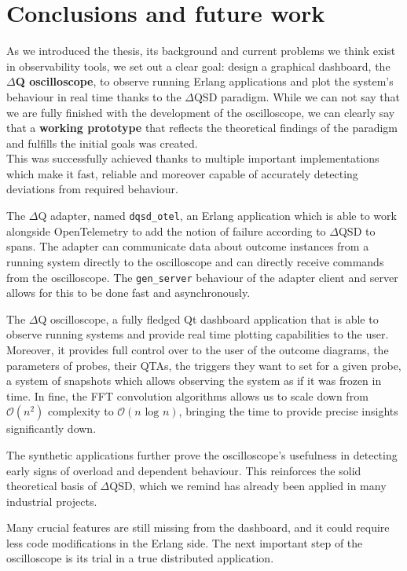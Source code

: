 \chapter{Conclusions and future work}

    As we introduced the thesis, its background and current problems we think exist in observability tools, we set out a clear goal: design a graphical dashboard, the \textbf{$\Delta$Q oscilloscope}, to observe running Erlang applications and plot the system's behaviour in real time thanks to the $\Delta$QSD paradigm.
    While we can not say that we are fully finished with the development of the oscilloscope, we can clearly say that a \textbf{working prototype} that reflects the theoretical findings of the paradigm and fulfills the initial goals was created. \\
    This was successfully achieved thanks to multiple important implementations which make it fast, reliable and moreover capable of accurately detecting deviations from required behaviour.
    
    The $\Delta$Q adapter, named \texttt{dqsd\_otel}, an Erlang application which is able to work alongside OpenTelemetry to add the notion of failure according to $\Delta$QSD to spans. The adapter can communicate data about outcome instances from a running system directly to the oscilloscope and can directly receive commands from the oscilloscope. The \texttt{gen\_server} behaviour of the adapter client and server allows for this to be done fast and asynchronously.


    The $\Delta$Q oscilloscope, a fully fledged Qt dashboard application that is able to observe running systems and provide real time plotting capabilities to the user. Moreover, it provides full control over to the user of the outcome diagrams, the parameters of probes, their QTAs, the triggers they want to set for a given probe, a system of snapshots which allows observing the system as if it was frozen in time. In fine, the FFT convolution algorithms allows us to scale down from $\mathcal{O}(n^2)$ complexity to $\mathcal{O}(n\text{ log }n)$, bringing the time to provide precise insights significantly down.

    The synthetic applications further prove the oscilloscope's usefulness in detecting early signs of overload and dependent behaviour. This reinforces the solid theoretical basis of $\Delta$QSD, which we remind has already been applied in many industrial projects.

    Many crucial features are still missing from the dashboard, and it could require less code modifications in the Erlang side. The next important step of the oscilloscope is its trial in a true distributed application.

